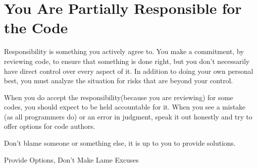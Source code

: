 
\chapter{You Are Partially Responsible for the Code}

Responsibility is something you actively agree to. You make a commitment, by reviewing code, to ensure that something is done right, but you don’t necessarily
have direct control over every aspect of it. In addition to doing your own
personal best, you must analyze the situation for risks that are beyond
your control.

When you do accept the responsibility(because you are reviewing) for some codes, you should expect to be held accountable for it. When you see a mistake (as all programmers do) or an error in judgment, speak it out honestly and try to offer options for code authors.

Don’t blame someone or something else, it is up to you to provide solutions.

\begin{marker}
Provide Options, Don’t Make Lame Excuses
\end{marker}